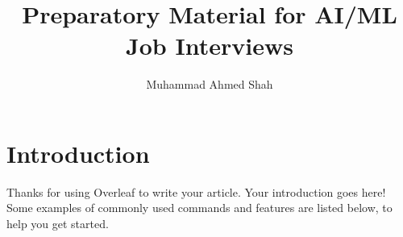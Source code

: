 \documentclass[fleqn,10pt]{olplainarticle}
\title{Preparatory Material for AI/ML Job Interviews}
\author[1]{Muhammad Ahmed Shah}
\affil[1]{Language Technologies Institute, Carnegie Mellon University}
\begin{document}
\flushbottom
\maketitle
\thispagestyle{empty}

\section{Introduction}

Thanks for using Overleaf to write your article. Your introduction goes here! Some examples of commonly used commands and features are listed below, to help you get started.


\end{document}
